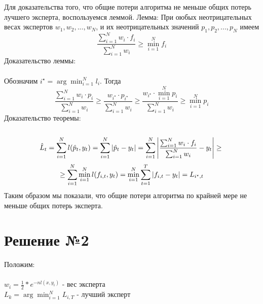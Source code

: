 \documentclass{article}
\begin{document}
Для доказательства того, что общие потери алгоритма не меньше общих потерь лучшего эксперта, воспользуемся леммой.
Лемма: При оюбых неотрицательных весах экспертов $w_1, w_2, ..., w_N$, и их неотрицательных значений  $p_1, p_2, ..., p_N$ имеем
$$
\frac{\sum_{i=1}^N w_i\cdot f_i}{\sum_{i=1}^N w_i} \geq \min_{i=1}^N f_i
$$
Доказательство леммы: \\\\
Обозначим $i^\star = \arg\min_{i=1}^N l_i$. Тогда
$$
\frac{\sum_{i=1}^N w_i\cdot p_i}{\sum_{i=1}^N w_i} \geq \frac{w_{i^\star} \cdot p_{i^\star}}{\sum_{i=1}^N w_i} \geq \frac{w_{i^\star} \cdot \min_{i=1}^N p_i}{\sum_{i=1}^N w_i} \geq \min_{i=1}^N p_i
$$
Доказательство теоремы: \\\\
$$
\hat{L}_t = \sum_{i=1}^N l(\hat{p}_t, y_t) = \sum_{i=1}^N |\hat{p}_t - y_t| = \sum_{i=1}^N \left|\frac{\sum_{i=1}^N w_i\cdot f_i}{\sum_{i=1}^N w_i} - y_t\right| \geq \\
$$
$$
\geq \sum_{i=1}^N \min_{i=1}^N l(f_{i,t},y_t) = \min_{i=1}^N \sum_{t=1}^T \left|f_{i,t} - y_t\right| = L_{i^\star,t} \\\\
$$
Таким образом мы показали, что общие потери алгоритма по крайней мере не меньше общих потерь эксперта.

\section{Решение №2}

Положим: \\\\
$w_i=\frac{1}{2}*e^{-nl(x,y_i)}$ - вес эксперта \\
$L_k = \arg\min_{i=1}^N L_{i,T}$ - лучший эксперт \\
\end{document}

